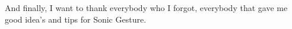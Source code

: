 \documentclass[a4paper, 11pt]{book}
\begin{document}
And finally, I want to thank everybody who I forgot, everybody that gave me good idea's and tips for Sonic Gesture. 


\cleardoublepage
{}
\setcounter{page}{1}















\cleardoublepage
{}
{}





\end{document}
